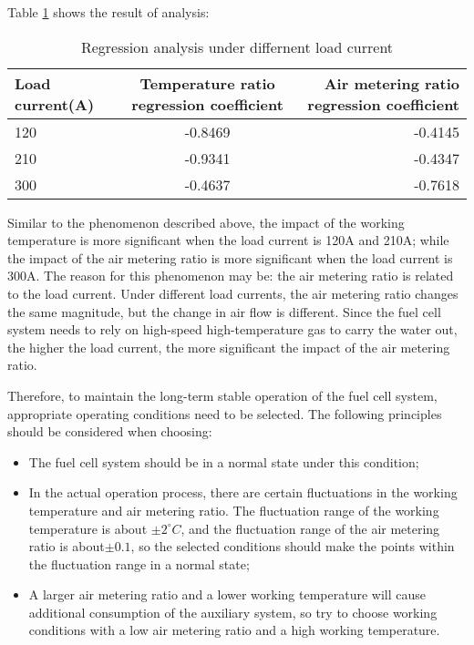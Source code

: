 \par
Table \ref{tab:RegressionAnalysis} shows the result of analysis:
\begin{table}
	\centering
	\begin{center}
		\caption{Regression analysis under differnent load current}
		\label{tab:RegressionAnalysis}
		\begin{tabular}{l||c|r}
			\hline
			\textbf{Load current(A)} & \textbf{Temperature ratio regression coefficient} & \textbf{Air metering ratio regression coefficient} \\
			\hline
			120                       & -0.8469                                           & -0.4145                                            \\
			210                       & -0.9341                                           & -0.4347                                            \\
			300                       & -0.4637                                           & -0.7618                                            \\
			\hline
		\end{tabular}
	\end{center}
\end{table}
Similar to the phenomenon described above, the impact of the working temperature is more significant when the load current is 120A and 210A; while the impact of the air metering ratio is more significant when the load current is 300A. The reason for this phenomenon may be: the air metering ratio is related to the load current. Under different load currents, the air metering ratio changes the same magnitude, but the change in air flow is different. Since the fuel cell system needs to rely on high-speed high-temperature gas to carry the water out, the higher the load current, the more significant the impact of the air metering ratio.
\par
Therefore, to maintain the long-term stable operation of the fuel cell system, appropriate operating conditions need to be selected. The following principles should be considered when choosing:
\begin{itemize}
	\item The fuel cell system should be in a normal state under this condition;
	\item In the actual operation process, there are certain fluctuations in the working temperature and air metering ratio. The fluctuation range of the working temperature is about $\pm2^{\circ}C$, and the fluctuation range of the air metering ratio is about$\pm0.1$, so the selected conditions should make the points within the fluctuation range in a normal state;
	\item A larger air metering ratio and a lower working temperature will cause additional consumption of the auxiliary system, so try to choose working conditions with a low air metering ratio and a high working temperature.
\end{itemize}
